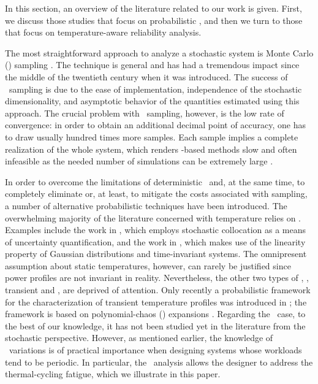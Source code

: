 In this section, an overview of the literature related to our work is given.
First, we discuss those studies that focus on probabilistic \ta, and then we turn to those that focus on temperature-aware reliability analysis.

The most straightforward approach to analyze a stochastic system is Monte Carlo (\MC) sampling \cite{maitre2010}.
The technique is general and has had a tremendous impact since the middle of the twentieth century when it was introduced.
The success of \MC\ sampling is due to the ease of implementation, independence of the stochastic dimensionality, and asymptotic behavior of the quantities estimated using this approach.
The crucial problem with \MC\ sampling, however, is the low rate of convergence: in order to obtain an additional decimal point of accuracy, one has to draw usually hundred times more samples.
Each sample implies a complete realization of the whole system, which renders \MC-based methods slow and often infeasible as the needed number of simulations can be extremely large \cite{diaz-emparanza2002}.

In order to overcome the limitations of deterministic \ta\ and, at the same time, to completely eliminate or, at least, to mitigate the costs associated with  sampling, a number of alternative probabilistic techniques have been introduced.
The overwhelming majority of the literature concerned with temperature relies on \sssta.
Examples include the work in \cite{lee2013}, which employs stochastic collocation \cite{maitre2010} as a means of uncertainty quantification, and the work in \cite{juan2012}, which makes use of the linearity property of Gaussian distributions and time-invariant systems.
The omnipresent assumption about static temperatures, however, can rarely be justified since power profiles are not invariant in reality.
Nevertheless, the other two types of \ta, \ie, transient and \DSS, are deprived of attention.
Only recently a probabilistic framework for the characterization of transient temperature profiles was introduced in \cite{ukhov2014}; the framework is based on polynomial-chaos (\PC) expansions \cite{maitre2010}.
Regarding the \DSS\ case, to the best of our knowledge, it has not been studied yet in the literature from the stochastic perspective.
However, as mentioned earlier, the knowledge of \DSS\ variations is of practical importance when designing systems whose workloads tend to be periodic.
In particular, the \DSS\ analysis allows the designer to address the thermal-cycling fatigue, which we illustrate in this paper.


